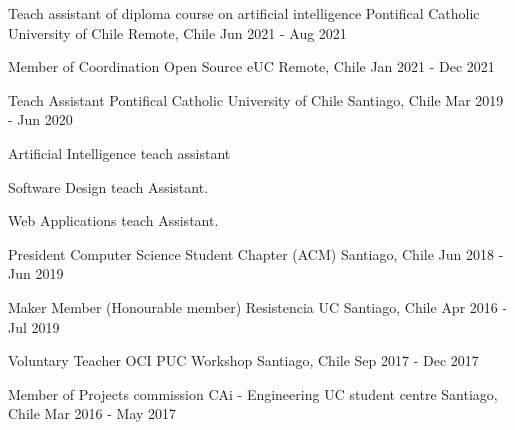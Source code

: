 

\begin{cventries}

\cventry
{Teach assistant of diploma course on artificial intelligence} %
{Pontifical Catholic University of Chile} %
{Remote, Chile} %
{Jun 2021 - Aug 2021} %
{}

\cventry
{Member of Coordination} %
{Open Source eUC} %
{Remote, Chile} %
{Jan 2021 - Dec 2021} %
{}

\cventry
{Teach Assistant} %
{Pontifical Catholic University of Chile} %
{Santiago, Chile} %
{Mar 2019 - Jun 2020} %
{
  \begin{cvitems} %
    \item {Artificial Intelligence teach assistant}
    \item {Software Design teach Assistant.}
    \item {Web Applications teach Assistant.}
  \end{cvitems}
}

\cventry
{President} %
{Computer Science Student Chapter (ACM)} %
{Santiago, Chile} %
{Jun 2018 - Jun 2019} %
{}


\cventry
{Maker Member (Honourable member)} %
{Resistencia UC} %
{Santiago, Chile} %
{Apr 2016 - Jul 2019} %
{}

\cventry
{Voluntary Teacher} %
{OCI PUC Workshop} %
{Santiago, Chile} %
{Sep 2017 - Dec 2017} %
{}

\cventry
{Member of Projects commission} %
{CAi - Engineering UC student centre} %
{Santiago, Chile} %
{Mar 2016 - May 2017} %
{}


\end{cventries}
